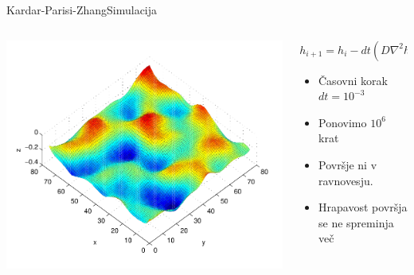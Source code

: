 \documentclass{beamer}
\begin{document}
\begin{frame}{Kardar-Parisi-Zhang}{Simulacija}
\begin{columns}
  \begin{column}{0.70\textwidth}
    \hspace*{-0.12\textwidth}\includegraphics[width=1.25\textwidth]{slike/KPZ-numericno}
  \end{column}
  \tiny{}
  \hspace*{-0.18\textwidth}\begin{column}{0.5\textwidth}
    \begin{equation} h_{i+1} = h_i - dt (D \nabla^2 h_i + \frac{u}{2} (\boldsymbol\nabla h_i \cdot \boldsymbol\nabla h_i) + \eta (\mathbf{x},t)) \end{equation}
    \newline\newline\newline\newline\newline\newline\newline\newline\newline\newline\newline\newline\newline\newline
    \begin{itemize}
      \item
        Časovni korak $dt = 10^{-3}$
      \item
        Ponovimo $10^6$ krat
      \item
        Površje ni v ravnovesju.
      \item
       Hrapavost površja se ne spreminja več
    \end{itemize}

  \end{column}
\end{columns}
\end{frame}
\end{document}
